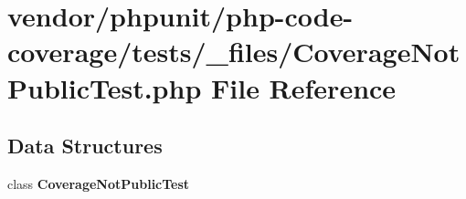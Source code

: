 \section{vendor/phpunit/php-\/code-\/coverage/tests/\+\_\+files/\+Coverage\+Not\+Public\+Test.php File Reference}
\label{php-code-coverage_2tests_2__files_2_coverage_not_public_test_8php}
\subsection*{Data Structures}
\begin{DoxyCompactItemize}
\item 
class {\bf Coverage\+Not\+Public\+Test}
\end{DoxyCompactItemize}
